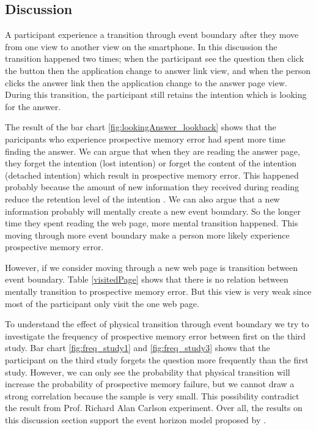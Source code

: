 \subsection{Discussion}
A participant experience a transition through event boundary after they move from one view to another view on the smartphone.
In this discussion the transition happened two times; when the participant see the question then click the button then the application change to answer link view,
and when the person clicks the answer link then the application change to the answer page view.
During this transition, the participant still retains the intention which is looking for the answer.

The result of the bar chart \ref{fig:lookingAnswer_lookback}  shows that the paricipants who experience prospective memory error had spent more time finding the answer.
We can argue that when they are reading the answer page, they forget the intention (lost intention) or forget the content of the intention (detached intention) which result in prospective memory error.
This happened probably because the amount of new information they received during reading reduce the retention level of the intention \citep{Reason1984}.
We can also argue that a new information probably will mentally create a new event boundary. So the longer time they spent reading the web page, more mental transition happened.
This moving through more event boundary make a person more likely experience prospective memory error.

However, if we consider moving through a new web page is transition between event boundary. Table \ref{visitedPage} shows that there is no relation between mentally transition to prospective memory error.
But this view is very weak since most of the participant only visit the one web page.

To understand the effect of physical transition through event boundary we try to investigate the frequency of prospective memory error between first on the third study.
Bar chart \ref{fig:freq_study1} and \ref{fig:freq_study3} shows that the participant on the third study forgets the question more frequently than the first study. However,
we can only see the probability that physical transition will increase the probability of prospective memory failure, but
we cannot draw a strong correlation because the sample is very small.
This possibility contradict the result from Prof. Richard Alan Carlson experiment.
Over all, the results on this discussion section support the event horizon model proposed by \cite{Radvansky2006}.
